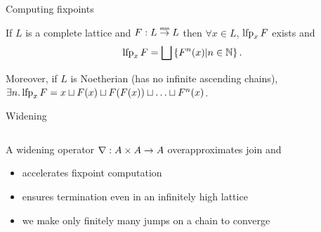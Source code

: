 \documentclass[aspectratio=169]{beamer}
\begin{document}
\begin{frame}{Computing fixpoints}
  \begin{thm}
    If $L$ is a complete lattice and $F: L \monarrow L$ then $\forall x \in L$, $\operatorname{lfp}_x F$ exists and
    \[
      \operatorname{lfp}_x F = \bigsqcup \left\{F^n(x) \vert n \in \mathbb{N}\right\}.
    \]
  \end{thm}

  Moreover, if $L$ is Noetherian (has no infinite ascending chains), $\exists n. \operatorname{lfp}_x F = x \sqcup F(x) \sqcup F(F(x)) \sqcup \ldots \sqcup F^n(x)$.
\end{frame}

\begin{frame}{Widening}
  \small
  \begin{columns}
    \begin{column}{0.75\textwidth}
      A widening operator $\nabla : A \times A \to A$ overapproximates join and
      \begin{itemize}      
      \item<2-> accelerates fixpoint computation
      \item<3-> ensures termination even in an infinitely high lattice
      \item<4-> we make only finitely many jumps on a chain to converge
  \end{itemize}\vspace{-0.3em}
\end{column}
\begin{column}{0.2\textwidth}\tiny
\end{column}
\end{columns}
\end{frame}
\end{document}
